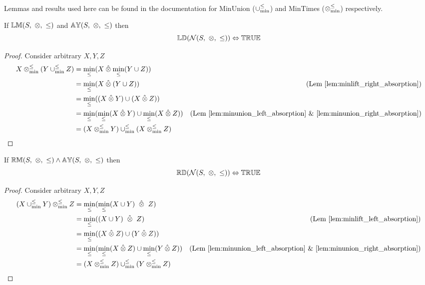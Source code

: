 Lemmas and results used here can be found in the documentation for MinUnion ($\mathbin{\cup_{\min}^{\leq}}$) and MinTimes ($\mathbin{\otimes_{\min}^{\leq}}$) respectively.


\begin{theorem} \label{thm:N_ld}
If ${\mathbb{LM}}(S,\ \otimes,\ \leq)$ and ${\mathbb{AY}}(S,\ \otimes, \ \leq)$ then
\begin{equation*}
\propname{LD}(\mathcal{N}(S,\ \otimes,\ \leq))  \Leftrightarrow \propname{TRUE}
\end{equation*}
\end{theorem}


\begin{proof}

\vspace{0.5em}
Consider arbitrary $X,Y,Z$
\begin{align*}
X \mathbin{\otimes_{\min}^{\leq}} (Y \mathbin{\cup_{\min}^{\leq}} Z) 	& = \min_\leq(X \mathbin{\hat{\otimes}} \min_\leq(Y \cup Z)) \\
							& = \min_\leq(X \mathbin{\hat{\otimes}} (Y \cup Z)) & \text{(Lem~\ref{lem:minlift_right_absorption})} \\
							& = \min_\leq((X \mathbin{\hat{\otimes}} Y) \cup (X \mathbin{\hat{\otimes}} Z)) \\
							& = \min_\leq(\min_\leq(X \mathbin{\hat{\otimes}} Y) \cup \min_\leq(X \mathbin{\hat{\otimes}} Z)) & \text{(Lem \ref{lem:minunion_left_absorption} \& \ref{lem:minunion_right_absorption})} \\
							& = (X \mathbin{\otimes_{\min}^{\leq}} Y) \mathbin{\cup_{\min}^{\leq}} (X \mathbin{\otimes_{\min}^{\leq}} Z)
\end{align*}
\end{proof}


\begin{theorem} \label{thm:N_rd}
If ${\mathbb{RM}}(S,\ \otimes,\ \leq) \wedge {\mathbb{AY}}(S,\ \otimes, \ \leq)$ then
\begin{equation*}
\propname{RD}(\mathcal{N}(S,\ \otimes,\ \leq))  \Leftrightarrow \propname{TRUE}
\end{equation*}
\end{theorem}
 

\begin{proof}

\vspace{0.5em}
Consider arbitrary $X,Y,Z$
\begin{align*}
(X \minunion Y) \minlift Z 	& = \min_\leq(\min_\leq(X \cup Y) \ \lift \ Z) \\
							& = \min_\leq((X \cup Y) \ \lift \ Z) & \text{(Lem \ref{lem:minlift_left_absorption})}\\
							& = \min_\leq((X \lift Z) \cup (Y \lift Z)) \\
							& = \min_\leq(\min_\leq(X \lift Z) \cup \min_\leq(Y \lift Z)) & \text{(Lem \ref{lem:minunion_left_absorption} \& \ref{lem:minunion_right_absorption})} \\
							& = (X \minlift Z) \minunion (Y \minlift Z)
\end{align*}
\end{proof}


